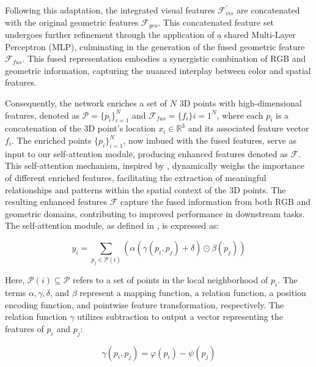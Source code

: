 Following this adaptation, the integrated visual features $\mathcal{F}_{vis}^{'}$ are concatenated with the original geometric features $\mathcal{F}_{geo}$. This concatenated feature set undergoes further refinement through the application of a shared Multi-Layer Perceptron (MLP), culminating in the generation of the fused geometric feature $\mathcal{F}_{fus}$. This fused representation embodies a synergistic combination of RGB and geometric information, capturing the nuanced interplay between color and spatial features.

Consequently, the network enriches a set of $N$ 3D points with high-dimensional features, denoted as $\mathcal{P} = \lbrace p_i \rbrace_{i=1}^{N}$ and $\mathcal{F}_{fus} = \lbrace f_i \rbrace{i=1}^{N}$, where each $p_i$ is a concatenation of the 3D point's location $x_i \in \mathbb{R}^{3}$ and its associated feature vector $f_i$. The enriched points $\lbrace p_{i} \rbrace_{i=1}^{N}$, now imbued with the fused features, serve as input to our self-attention module, producing enhanced features denoted as $\mathcal{F}$. This self-attention mechanism, inspired by \cite{vaswani2017attention}, dynamically weighs the importance of different enriched features, facilitating the extraction of meaningful relationships and patterns within the spatial context of the 3D points. The resulting enhanced features $\mathcal{F}$ capture the fused information from both RGB and geometric domains, contributing to improved performance in downstream tasks. The self-attention module, as defined in \cite{vaswani2017attention}, is expressed as:

\begin{equation}
y_{i} = \sum_{p_{j} \in \mathcal{P}(i)} (\alpha(\gamma(p_{i},p_{j}) + \delta) \odot \beta(p_{j}))
\end{equation}

\noindent Here, $\mathcal{P}(i) \subseteq \mathcal{P}$ refers to a set of points in the local neighborhood of $p_{i}$. The terms $\alpha, \gamma, \delta$, and $\beta$ represent a mapping function, a relation function, a position encoding function, and pointwise feature transformation, respectively. The relation function $\gamma$ utilizes subtraction to output a vector representing the features of $p_i$ and $p_j$:

\begin{equation}
\gamma(p_{i},p_{j}) = \varphi(p_i) - \psi(p_j)
\end{equation}

